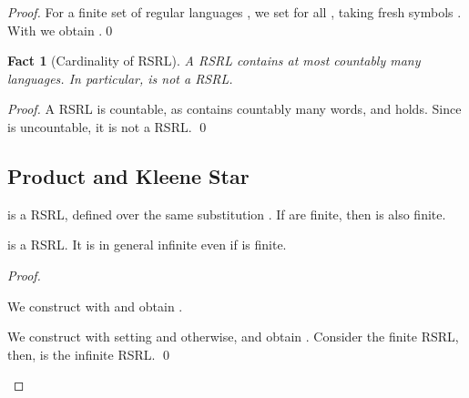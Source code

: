 \documentclass[envcountsame]{llncs}
\newcommand{\RegularlyGeneratedLanguageSetAbbrev}{RSRL\xspace}
\newcommand{\RegularlyGeneratedLanguageSetsTitleAbbrev}{RSRL\xspace}
\newtheorem{fact}[theorem]{Fact}
\begin{document}
\begin{proof}
  For a finite set of regular languages , we set
   for all , taking fresh
  symbols .
With  we
  obtain .\qed
\end{proof}


\begin{fact}[Cardinality of \RegularlyGeneratedLanguageSetsTitleAbbrev]
  \label{fact:rational-sets-cardinality}
  A \RegularlyGeneratedLanguageSetAbbrev contains at most countably many languages. In
  particular,  is not a \RegularlyGeneratedLanguageSetAbbrev. 
\end{fact}

\begin{proof}
  A \RegularlyGeneratedLanguageSetAbbrev  is countable, as 
  contains countably many words, and  holds.
Since  is uncountable, it is not a \RegularlyGeneratedLanguageSetAbbrev. \qed
\end{proof}



\subsection{Product and Kleene Star}
\label{sec:product-kleene-star}



\begin{proposition}
  \label{prop:closure:product-kleene}
  \begin{inparaenum}
  \item  is a \RegularlyGeneratedLanguageSetAbbrev,
    defined over the same substitution . If 
    are finite, then  is also
    finite.
  \item  is a \RegularlyGeneratedLanguageSetAbbrev.
It is in general infinite even if  is finite.
  \end{inparaenum}
\end{proposition}

\begin{proof}
  \begin{inparaenum}[\bfseries(1)]
  \item We construct  with  and obtain .
  \item We construct  with 
    setting  and
     otherwise, and obtain
    .
Consider the finite \RegularlyGeneratedLanguageSetAbbrev ,
    then,  is the infinite \RegularlyGeneratedLanguageSetAbbrev .
\qed
  \end{inparaenum}
\end{proof}
\end{document}
